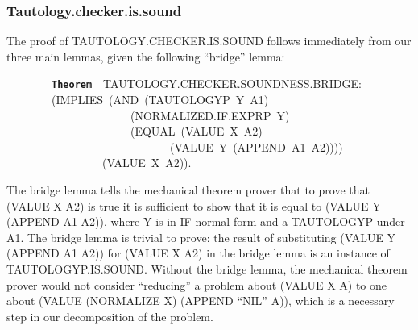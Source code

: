 \documentclass[11pt]{book}
\newenvironment{pubasis}{\begin{flushleft}\ttfamily\small}{\normalsize\rmfamily\end{flushleft}}
\newcommand{\axiomordefinition}[1]{\vspace{6pt}\texttt{\textbf{#1}}}
\newcommand{\pubdefaulttextsize}{\large}
\begin{document}
\subsubsection{Tautology.checker.is.sound}
\pubdefaulttextsize
The proof of TAU\-TOL\-OGY.CHECK\-ER.IS.SOUND
follows immediately from our three main lemmas, given the following
``bridge'' lemma:
\begin{pubasis}
~~~~~~~~\axiomordefinition{Theorem}~~TAU\-TOL\-OGY.CHECK\-ER.SOUNDNESS.BRIDGE:\\
~~~~~~~~(IMPLIES~(AND~(TAUTOLOGYP~Y~A1)\\
~~~~~~~~~~~~~~~~~~~~~~(NOR\-MAL\-IZED.IF.EXPRP~Y)\\
~~~~~~~~~~~~~~~~~~~~~~(EQUAL~(VALUE~X~A2)\\
~~~~~~~~~~~~~~~~~~~~~~~~~~~~~(VALUE~Y~(APPEND~A1~A2))))\\
~~~~~~~~~~~~~~~~~(VALUE~X~A2)).\\
\end{pubasis}
The bridge lemma tells the mechanical theorem prover that to prove
that (VALUE X A2) is true it is sufficient to show that it is
equal to (VALUE Y (APPEND A1 A2)), where Y is in IF-normal form
and a TAUTOLOGYP under A1.  The bridge lemma is trivial to prove:
the result of substituting (VALUE Y (APPEND A1 A2)) for (VALUE X A2) in the bridge lemma is
an instance of TAU\-TOL\-OGYP.IS.SOUND.
Without the bridge lemma, the mechanical theorem prover would not
consider ``reducing'' a problem about (VALUE X A) to one about
(VALUE (NORMALIZE X) (APPEND ``NIL'' A)), which is a necessary step in our
decomposition of the problem.
\end{document}
